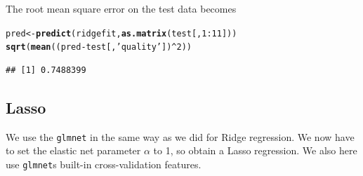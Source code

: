 \documentclass[a4paper]{article}\usepackage[]{graphicx}\usepackage[]{color}
\makeatletter
\newcommand{\hlnum}[1]{\textcolor[rgb]{0.686,0.059,0.569}{#1}}%
\newcommand{\hlstr}[1]{\textcolor[rgb]{0.192,0.494,0.8}{#1}}%
\newcommand{\hlopt}[1]{\textcolor[rgb]{0,0,0}{#1}}%
\newcommand{\hlstd}[1]{\textcolor[rgb]{0.345,0.345,0.345}{#1}}%
\newcommand{\hlkwb}[1]{\textcolor[rgb]{0.69,0.353,0.396}{#1}}%
\newcommand{\hlkwd}[1]{\textcolor[rgb]{0.737,0.353,0.396}{\textbf{#1}}}%
\newenvironment{kframe}{%
 \def\at@end@of@kframe{}%
 \ifinner\ifhmode%
  \def\at@end@of@kframe{\end{minipage}}%
  \begin{minipage}{\columnwidth}%
 \fi\fi%
 \def\FrameCommand##1{\hskip\@totalleftmargin \hskip-\fboxsep
 \colorbox{shadecolor}{##1}\hskip-\fboxsep
     \hskip-\linewidth \hskip-\@totalleftmargin \hskip\columnwidth}%
 \MakeFramed {\advance\hsize-\width
   \@totalleftmargin\z@ \linewidth\hsize
   \@setminipage}}%
 {\par\unskip\endMakeFramed%
 \at@end@of@kframe}
\newenvironment{knitrout}{}{} %
\makeatother
\begin{document}
The root mean square error on the test data becomes
\begin{knitrout}
\color{fgcolor}\begin{kframe}
\begin{alltt}
\hlstd{pred} \hlkwb{<-} \hlkwd{predict}\hlstd{(ridgefit,} \hlkwd{as.matrix}\hlstd{(test[,}\hlnum{1}\hlopt{:}\hlnum{11}\hlstd{]))}
\hlkwd{sqrt}\hlstd{(}\hlkwd{mean}\hlstd{((pred} \hlopt{-} \hlstd{test[,}\hlstr{'quality'}\hlstd{])}\hlopt{^}\hlnum{2}\hlstd{))}
\end{alltt}
\begin{verbatim}
## [1] 0.7488399
\end{verbatim}
\end{kframe}
\end{knitrout}

\subsection{Lasso}
We use the \texttt{glmnet} in the same way as we did for Ridge regression. We now have to set the elastic net parameter $\alpha$ to 1, so obtain a Lasso regression. We also here use \texttt{glmnet}s built-in cross-validation features.
\end{document}
